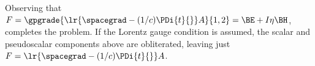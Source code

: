 {%
Observing that \( F = \gpgrade{ \lr{ \spacegrad -(1/c) \PDi{t}{} } A }{1,2} = \BE + I \eta \BH \), completes the problem.  If the Lorentz gauge condition is assumed, the scalar and pseudoscalar components above are obliterated, leaving just
\( F = \lr{ \spacegrad -(1/c) \PDi{t}{} } A \).
} %
